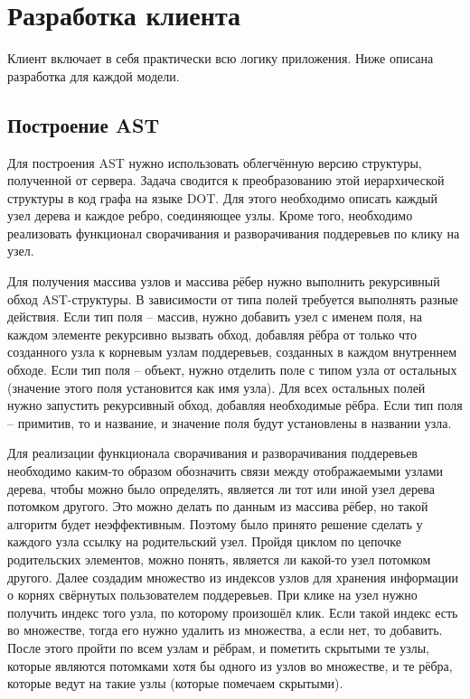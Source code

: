 \section{Разработка клиента} \label{ch5:sec2}
Клиент включает в себя практически всю логику приложения. Ниже описана разработка для каждой модели.
\subsection{Построение AST} \label{ch2:subsec-title-abbr}
Для построения AST нужно использовать облегчённую версию структуры, полученной от сервера. Задача сводится к преобразованию этой иерархической структуры в код графа на языке DOT. Для этого необходимо описать каждый узел дерева и каждое ребро, соединяющее узлы. Кроме того, необходимо реализовать функционал сворачивания и разворачивания поддеревьев по клику на узел.

Для получения массива узлов и массива рёбер нужно выполнить рекурсивный обход AST-структуры. В зависимости от типа полей требуется выполнять разные действия. Если тип поля – массив, нужно добавить узел с именем поля, на каждом элементе рекурсивно вызвать обход, добавляя рёбра от только что созданного узла к корневым узлам поддеревьев, созданных в каждом внутреннем обходе. Если тип поля – объект, нужно отделить поле с типом узла от остальных (значение этого поля установится как имя узла). Для всех остальных полей нужно запустить рекурсивный обход, добавляя необходимые рёбра. Если тип поля – примитив, то и название, и значение поля будут установлены в названии узла.

Для реализации функционала сворачивания и разворачивания поддеревьев необходимо каким-то образом обозначить связи между отображаемыми узлами дерева, чтобы можно было определять, является ли тот или иной узел дерева потомком другого. Это можно делать по данным из массива рёбер, но такой алгоритм будет неэффективным. Поэтому было принято решение сделать у каждого узла ссылку на родительский узел. Пройдя циклом по цепочке родительских элементов, можно понять, является ли какой-то узел потомком другого. Далее создадим множество из индексов узлов для хранения информации о корнях свёрнутых пользователем поддеревьев. При клике на узел нужно получить индекс того узла, по которому произошёл клик. Если такой индекс есть во множестве, тогда его нужно удалить из множества, а если нет, то добавить. После этого пройти по всем узлам и рёбрам, и пометить скрытыми те узлы, которые являются потомками хотя бы одного из узлов во множестве, и те рёбра, которые ведут на такие узлы (которые помечаем скрытыми).

